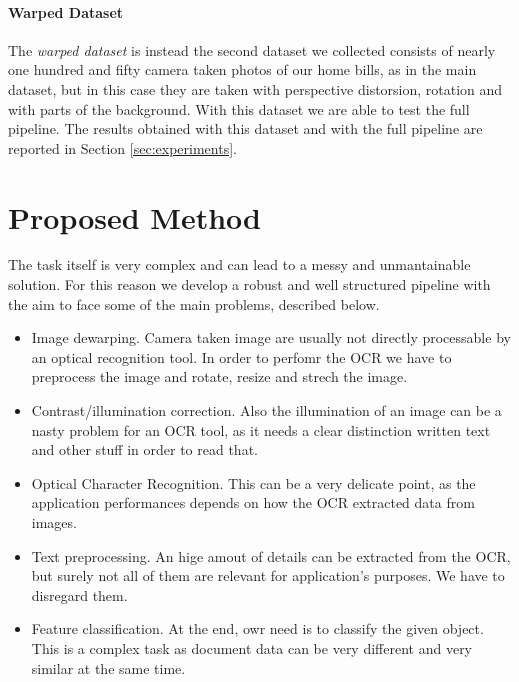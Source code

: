 \documentclass[10pt,twocolumn,letterpaper]{article}
\begin{document}
\paragraph{Warped Dataset}
\label{par:warped-dataset}

The \emph{warped dataset} is instead the second dataset we collected
consists of nearly one hundred and fifty camera taken photos of our
home bills, as in the main dataset, but in this case they are taken
with perspective distorsion, rotation and with parts of the
background. With this dataset we are able to test the full
pipeline. The results obtained with this dataset and with the full
pipeline are reported in Section \ref{sec:experiments}.

\section{Proposed Method}
\label{sec:proposed-method}

The task itself is very complex and can lead to a messy and
unmantainable solution. For this reason we develop a robust and well
structured pipeline with the aim to face some of the main problems,
described below.

\begin{itemize}
  \item Image dewarping. Camera taken image are usually not directly
    processable by an optical recognition tool. In order to perfomr
    the OCR we have to preprocess the image and rotate, resize and
    strech the image.
  \item Contrast/illumination correction. Also the illumination of an
    image can be a nasty problem for an OCR tool, as it needs a clear
    distinction written text and other stuff in order to read that.
  \item Optical Character Recognition. This can be a very delicate
    point, as the application performances depends on how the OCR
    extracted data from images.
  \item Text preprocessing. An hige amout of details can be extracted
    from the OCR, but surely not all of them are relevant for
    application's purposes. We have to disregard them.
  \item Feature classification. At the end, owr need is to classify
    the given object. This is a complex task as document data can be
    very different and very similar at the same time.
\end{itemize}
\end{document}
